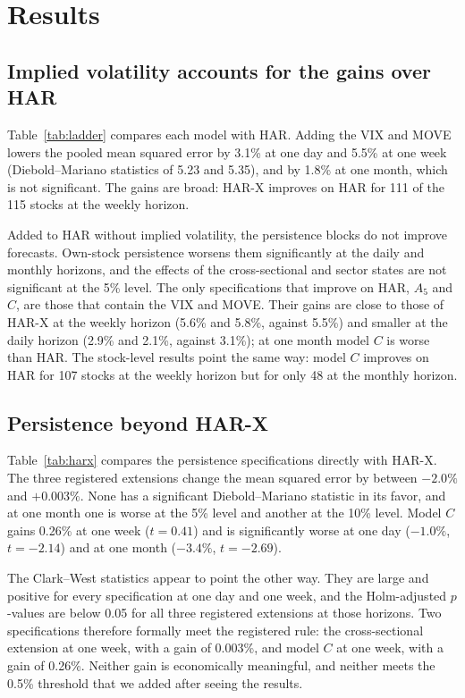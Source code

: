 \section{Results}\label{sec:results}

\subsection{Implied volatility accounts for the gains over HAR}

Table~\ref{tab:ladder} compares each model with HAR. Adding the VIX and MOVE
lowers the pooled mean squared error by 3.1\% at one day and 5.5\% at one
week (Diebold--Mariano statistics of 5.23 and 5.35), and by 1.8\% at one
month, which is not significant. The gains are broad: HAR-X improves on HAR
for 111 of the 115 stocks at the weekly horizon.



Added to HAR without implied volatility, the persistence blocks do not
improve forecasts. Own-stock persistence worsens them significantly at the
daily and monthly horizons, and the effects of the cross-sectional and
sector states are not significant at the 5\% level. The only specifications
that improve on HAR, $A_5$ and $C$, are those that contain the VIX and MOVE.
Their gains are close to those of HAR-X at the weekly horizon (5.6\% and
5.8\%, against 5.5\%) and smaller at the daily horizon (2.9\% and 2.1\%,
against 3.1\%); at one month model $C$ is worse than HAR. The stock-level
results point the same way: model $C$ improves on HAR for 107 stocks at the
weekly horizon but for only 48 at the monthly horizon.

\subsection{Persistence beyond HAR-X}

Table~\ref{tab:harx} compares the persistence specifications directly with
HAR-X. The three registered extensions change the mean squared error by
between $-2.0\%$ and $+0.003\%$. None has a significant Diebold--Mariano
statistic in its favor, and at one month one is worse at the 5\% level and
another at the 10\% level. Model $C$ gains 0.26\% at one week ($t=0.41$) and
is significantly worse at one day ($-1.0\%$, $t=-2.14$) and at one month
($-3.4\%$, $t=-2.69$).



The Clark--West statistics appear to point the other way. They are large and
positive for every specification at one day and one week, and the
Holm-adjusted $p$-values are below 0.05 for all three registered extensions
at those horizons. Two specifications therefore formally meet the registered
rule: the cross-sectional extension at one week, with a gain of 0.003\%, and
model $C$ at one week, with a gain of 0.26\%. Neither gain is economically
meaningful, and neither meets the 0.5\% threshold that we added after seeing
the results.

